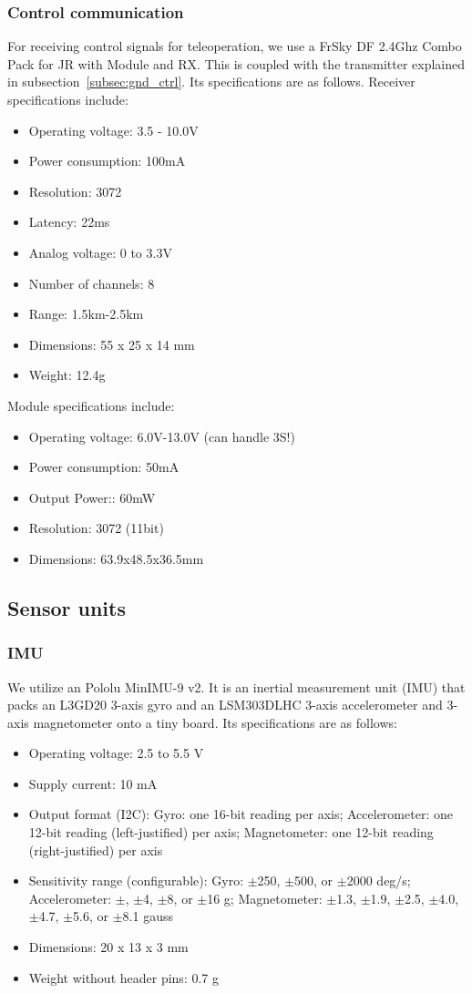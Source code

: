 \documentclass[a4paper, 10pt, twocolumn, titlepage]{article}
\begin{document}
\subsubsection{Control communication} \label{subsec:ctrl_comm}
For receiving control signals for teleoperation, we use a FrSky DF 2.4Ghz Combo Pack for JR with Module and RX.
This is coupled with the transmitter explained in subsection~\ref{subsec:gnd_ctrl}.
Its specifications are as follows.
Receiver specifications include:
\begin{itemize}
\itemsep-1mm
  \item Operating voltage:  3.5 - 10.0V
  \item Power consumption: 100mA
  \item Resolution: 3072
  \item Latency: 22ms
  \item Analog voltage: 0 to 3.3V
  \item Number of channels: 8
  \item Range: 1.5km-2.5km
  \item Dimensions: 55 x 25 x 14 mm
  \item Weight: 12.4g
\end{itemize}
Module specifications include:
\begin{itemize}
\itemsep-1mm
  \item Operating voltage: 6.0V-13.0V (can handle 3S!)
  \item Power consumption: 50mA
  \item Output Power:: 60mW
  \item Resolution: 3072 (11bit)
  \item Dimensions: 63.9x48.5x36.5mm
\end{itemize}

\subsection{Sensor units}
\subsubsection{IMU}
We utilize an Pololu MinIMU-9 v2.
It is an inertial measurement unit (IMU) that packs an L3GD20 3-axis gyro and an LSM303DLHC 3-axis accelerometer and 3-axis magnetometer onto a tiny board.
Its specifications are as follows:
\begin{itemize}
\itemsep-1mm
  \item Operating voltage: 2.5 to 5.5 V
  \item Supply current: 10 mA
  \item Output format (I2C): Gyro: one 16-bit reading per axis; Accelerometer: one 12-bit reading (left-justified) per axis; Magnetometer: one 12-bit reading (right-justified) per axis
  \item Sensitivity range (configurable): Gyro: $\pm$250, $\pm$500, or $\pm$2000 deg/s; Accelerometer: $\pm$, $\pm$4, $\pm$8, or $\pm$16 g; Magnetometer: $\pm$1.3, $\pm$1.9, $\pm$2.5, $\pm$4.0, $\pm$4.7, $\pm$5.6, or $\pm$8.1 gauss
  \item Dimensions: 20 x 13 x 3 mm
  \item Weight without header pins: 0.7 g
\end{itemize}
\end{document}
